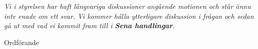 \documentclass[../_main/handlingar.tex]{subfiles}
\begin{document}
\motionssvar
\textit{Vi i styrelsen har haft långvariga diskussioner angående motionen och står ännu inte enade om ett svar. Vi kommer hålla ytterligare diskussion i frågan och sedan gå ut med vad vi kommit fram till i \textbf{Sena handlingar}.}





\begin{signatures}{1}
	\ist
	\signature{Daniel Bakic}{Ordförande}
\end{signatures}
\end{document}
